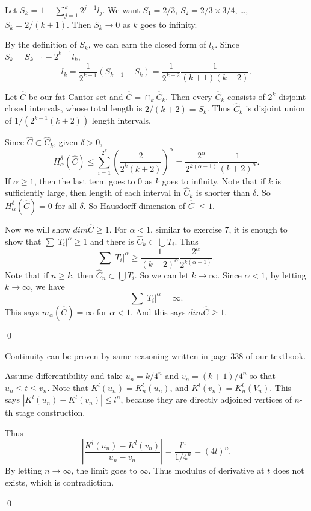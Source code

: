 \begin{exercise}[7.10] \hfill

	Let $S_k = 1- \sum_{j=1}^k 2^{j-1}l_j$.
	We want $S_1 = 2/3$, $S_2 = 2/3 \times 3/4$, \ldots, $S_k = 2/(k+1)$.
	Then $S_k \rightarrow 0$ as $k$ goes to infinity.

	By the definition of $S_k$, we can earn the closed form of $l_k$.
	Since $S_k = S_{k-1} - 2^{k-1}l_k$,
	\[
		l_k = \frac{1}{2^{k-1}}\left( S_{k-1} - S_k \right)
		= \frac{1}{2^{k-2}}\frac{1}{(k+1)(k+2)}.
	\]

	Let $\hat{C}$ be our fat Cantor set and $\hat{C} = \cap_k \hat{C}_k$.
	Then every $\hat{C}_k$ consists of $2^k$ disjoint closed intervals, whose total length is $2/(k+2) = S_k$.
	Thus $\hat{C}_k$ is disjoint union of $1/(2^{k-1}(k+2))$ length intervals.

	Since $\hat{C} \subset \hat{C}_k$, given $\delta>0$,
	\[
		H_\alpha^\delta(\hat{C}) \le \sum_{i=1}^{2^k} \left( \frac{2}{2^{k}(k+2)} \right)^\alpha
		= \frac{2^\alpha}{2^{k(\alpha-1)}}\frac{1}{(k+2)^\alpha}.
	\]
	If $\alpha \ge 1$, then the last term goes to $0$ as $k$ goes to infinity.
	Note that if $k$ is sufficiently large, then length of each interval in $\hat{C}_k$ is shorter than $\delta$.
	So $H_\alpha^\delta(\hat{C}) = 0$ for all $\delta$.
	So Hausdorff dimension of $\hat{C}$ $\le 1$.

	Now we will show $dim \hat{C} \ge 1$.
	For $\alpha < 1$, similar to exercise 7, it is enough to show that $\sum |T_i|^\alpha \ge 1$
	and there is $\hat{C}_k \subset \bigcup T_i$.
	Thus
	\[
		\sum|T_i|^\alpha \ge \frac{1}{(k+2)^\alpha}\frac{2^\alpha}{2^{k(\alpha-1)}}.
	\]
	Note that if $n \ge k$, then $\hat{C}_n \subset \bigcup T_i$.
	So we can let $k\rightarrow \infty$.
	Since $\alpha <1$, by letting $k\rightarrow \infty$, we have
	\[
		\sum |T_i|^\alpha = \infty.
	\]
	This says $m_\alpha(\hat{C}) = \infty$ for $\alpha < 1$.
	And this says $dim \hat{C} \ge 1$.

	\qed
\end{exercise}

\begin{exercise}[7.16] \hfill

	Continuity can be proven by same reasoning written in page 338 of our textbook.

	Assume differentibility and take $u_n = k/4^n$ and $v_n = (k+1)/4^n$ so that $u_n \le t \le v_n$.
	Note that $K^l(u_n) = K_n^l(u_n)$, and $K^l(v_n) = K^l_n(V_n)$.
	This says $|K^l(u_n) - K^l(v_n)| \le l^n$, because they are directly adjoined vertices of $n$-th stage construction.

	Thus
	\[
		\left \lvert \frac{K^l(u_n) - K^l(v_n)}{u_n - v_n} \right \lvert = \frac{l^n}{1/4^n} = (4l)^n.
	\]
	By letting $n\rightarrow \infty$, the limit goes to $\infty$.
	Thus modulus of derivative at $t$ does not exists, which is contradiction.

	\qed
\end{exercise}
